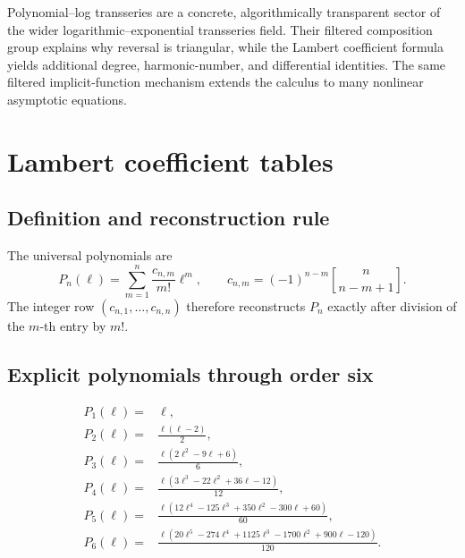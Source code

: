 \documentclass[11pt,openany]{book}
\theoremstyle{definition}
\theoremstyle{plain}
\theoremstyle{remark}
\newcommand{\stirlingone}[2]{\genfrac{[}{]}{0pt}{}{#1}{#2}}
\begin{document}
\begin{summarybox}
Polynomial--log transseries are a concrete, algorithmically transparent sector of the wider logarithmic--exponential transseries field. Their filtered composition group explains why reversal is triangular, while the Lambert coefficient formula yields additional degree, harmonic-number, and differential identities. The same filtered implicit-function mechanism extends the calculus to many nonlinear asymptotic equations.
\end{summarybox}

\appendix

\chapter{Lambert coefficient tables}\label{app:Lambert-tables}

\section{Definition and reconstruction rule}
The universal polynomials are
\begin{equation}\label{eq:appendix-Pn}
 P_n(\ell)=\sum_{m=1}^{n}\frac{c_{n,m}}{m!}\ell^m,
 \qquad
 c_{n,m}=(-1)^{n-m}\stirlingone{n}{n-m+1}.
\end{equation}
The integer row \((c_{n,1},\ldots,c_{n,n})\) therefore reconstructs \(P_n\) exactly after division of the \(m\)-th entry by \(m!\).

\section{Explicit polynomials through order six}
\begin{align*}
P_1(\ell)={}&\ell,\\
P_2(\ell)={}&\frac{\ell(\ell-2)}2,\\
P_3(\ell)={}&\frac{\ell(2\ell^2-9\ell+6)}6,\\
P_4(\ell)={}&\frac{\ell(3\ell^3-22\ell^2+36\ell-12)}{12},\\
P_5(\ell)={}&\frac{\ell(12\ell^4-125\ell^3+350\ell^2-300\ell+60)}{60},\\
P_6(\ell)={}&\frac{\ell(20\ell^5-274\ell^4+1125\ell^3-1700\ell^2+900\ell-120)}{120}.
\end{align*}
\end{document}

